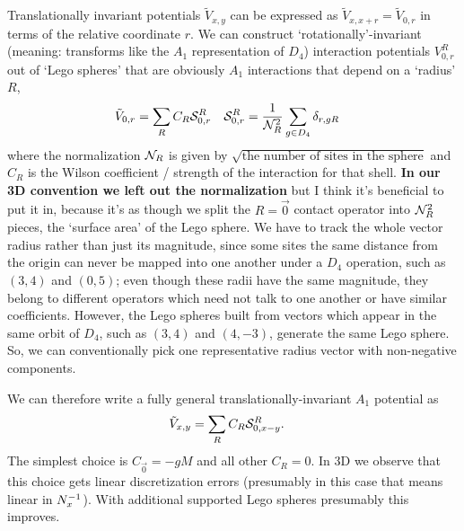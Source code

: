 Translationally invariant potentials $\tilde{V}_{x,y}$ can be expressed as $\tilde{V}_{x,x+r} = \tilde{V}_{0,r}$  in terms of the relative coordinate $r$.
We can construct `rotationally'-invariant (meaning: transforms like the $A_1$ representation of $D_4$) interaction potentials $V^R_{0,r}$ out of `Lego spheres'  that are obviously $A_1$ interactions that depend on a `radius' $R$,
\begin{align}
    \tilde{V}_{0,r} &= \sum_{R} C_R \mathcal{S}^{R}_{0,r}
    &
    \mathcal{S}^{R}_{0,r} &= \frac{1}{\mathcal{N}_{R}^2}\sum_{g \in D_4} \delta_{r, gR}
    \label{eq:Lego sphere}
\end{align}
where the normalization $\mathcal{N}_{R}$ is given by $\sqrt{\textrm{the number of sites in the sphere}}$ and $C_R$ is the Wilson coefficient / strength of the interaction for that shell.
{\bf In our 3D convention we left out the normalization} but I think it's beneficial to put it in, because it's as though we split the $R=\vec{0}$ contact operator into $\mathcal{N}_{R}^2$ pieces, the `surface area' of the Lego sphere.
We have to track the whole vector radius rather than just its magnitude, since some sites the same distance from the origin can never be mapped into one another under a $D_4$ operation, such as $(3,4)$ and $(0,5)$; even though these radii have the same magnitude, they belong to different operators which need not talk to one another or have similar coefficients.
However, the Lego spheres built from vectors which appear in the same orbit of $D_4$, such as $(3,4)$ and $(4,-3)$, generate the same Lego sphere.
So, we can conventionally pick one representative radius vector with non-negative components.

We can therefore write a fully general translationally-invariant $A_1$ potential as
\begin{align}
    \tilde{V}_{x,y} &= \sum_{R} C_R \mathcal{S}^{R}_{0,x-y}.
\end{align}
The simplest choice is $C_{\vec{0}} = -gM$ and all other $C_R=0$.
In 3D we observe that this choice gets linear discretization errors (presumably in this case that means linear in $N_x^{-1}$).
With additional supported Lego spheres presumably this improves.
